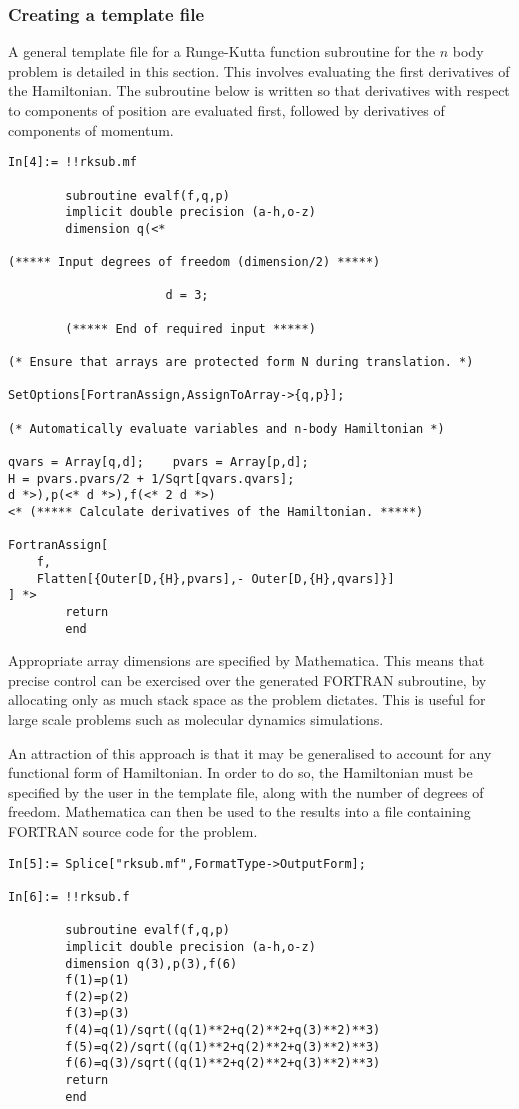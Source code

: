 \documentclass [12pt,twoside]{article}
\begin{document}
\subsubsection{Creating a template file}

A general template file for a Runge-Kutta function subroutine for the $n$ body
problem is detailed in this section. This involves evaluating the first
derivatives of the Hamiltonian. The subroutine below is written so that
derivatives with respect to components of position are evaluated first, followed
by derivatives of components of momentum.

\begin{verbatim}
In[4]:= !!rksub.mf

        subroutine evalf(f,q,p)
        implicit double precision (a-h,o-z)
        dimension q(<* 

(***** Input degrees of freedom (dimension/2) *****)

                      d = 3;

        (***** End of required input *****)

(* Ensure that arrays are protected form N during translation. *)

SetOptions[FortranAssign,AssignToArray->{q,p}];

(* Automatically evaluate variables and n-body Hamiltonian *)

qvars = Array[q,d];    pvars = Array[p,d];
H = pvars.pvars/2 + 1/Sqrt[qvars.qvars];
d *>),p(<* d *>),f(<* 2 d *>)
<* (***** Calculate derivatives of the Hamiltonian. *****)

FortranAssign[
    f, 
    Flatten[{Outer[D,{H},pvars],- Outer[D,{H},qvars]}]
] *>
        return
        end
\end{verbatim}
Appropriate array dimensions are specified by Mathematica. This means that precise
control can be exercised over the generated FORTRAN subroutine, by allocating
only as much stack space as the problem dictates. This is useful for large scale
problems such as molecular dynamics simulations.

An attraction of this approach is that it may be generalised to account for any
functional form of Hamiltonian. In order to do so, the Hamiltonian must be
specified by the user in the template file, along with the number of degrees of
freedom. Mathematica can then be used to  the results
into a file containing FORTRAN source code for the problem.
\begin{verbatim}
In[5]:= Splice["rksub.mf",FormatType->OutputForm];

In[6]:= !!rksub.f

        subroutine evalf(f,q,p)
        implicit double precision (a-h,o-z)
        dimension q(3),p(3),f(6)
        f(1)=p(1)
        f(2)=p(2)
        f(3)=p(3)
        f(4)=q(1)/sqrt((q(1)**2+q(2)**2+q(3)**2)**3)
        f(5)=q(2)/sqrt((q(1)**2+q(2)**2+q(3)**2)**3)
        f(6)=q(3)/sqrt((q(1)**2+q(2)**2+q(3)**2)**3)
        return
        end
\end{verbatim}
\end{document}
